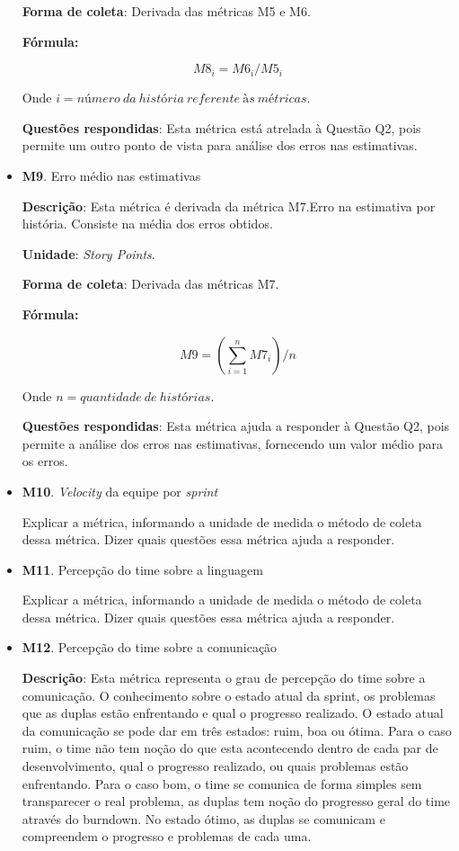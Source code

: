 \begin{itemize}
	   \subitem \textbf{Forma de coleta}: Derivada das métricas M5 e M6.
	   
	      \subsubitem \textbf{Fórmula:} 
	      
		$$ M8_i = M6_i / M5_i $$
		
	      \subsubitem Onde $i = número\ da\ história\ referente\ às\ métricas$.
	   
	   \subitem \textbf{Questões respondidas}: Esta métrica está atrelada à Questão Q2, pois permite um outro ponto de vista
		    para análise dos erros nas estimativas.
	 
	 \item \textbf{M9}. Erro médio nas estimativas
	   
	   \subitem \textbf{Descrição}: Esta métrica é derivada da métrica M7.Erro na estimativa por história.
		    Consiste na média dos erros obtidos.
	   
	   \subitem \textbf{Unidade}: \textit{Story Points}.
	   
	   \subitem \textbf{Forma de coleta}: Derivada das métricas M7.
	   
	      \subsubitem \textbf{Fórmula:} 
	      
		$$ M9 = (\sum\limits_{i=1}^{n}M7_i)/n $$
		
	      \subsubitem Onde $n = quantidade\ de\ histórias$.
	   
	   \subitem \textbf{Questões respondidas}: Esta métrica ajuda a responder à Questão Q2, pois permite a análise 
		    dos erros nas estimativas, fornecendo um valor médio para os erros.
		    
	 \item \textbf{M10}. \textit{Velocity} da equipe por \textit{sprint}
	 
	   \subitem Explicar a métrica, informando a unidade de medida o método de coleta dessa métrica. Dizer quais questões essa
		    métrica ajuda a responder.
	 
	 \item \textbf{M11}. Percepção do time sobre a linguagem
	 
	   \subitem Explicar a métrica, informando a unidade de medida o método de coleta dessa métrica. Dizer quais questões essa
		    métrica ajuda a responder.
	
	 \item \textbf{M12}. Percepção do time sobre a comunicação
	 
	    \subitem \textbf{Descrição}: Esta métrica representa o grau de percepção do time sobre a comunicação. O conhecimento sobre o estado atual da sprint, os problemas que as duplas estão enfrentando e qual o progresso realizado. O estado atual da comunicação se pode dar em três estados: ruim, boa ou ótima. Para o caso ruim, o time não tem noção do que esta acontecendo dentro de cada par de desenvolvimento, qual o progresso realizado, ou quais problemas estão enfrentando. Para o caso bom, o time se comunica de forma simples sem transparecer o real problema, as duplas tem noção do progresso geral do time através do burndown. No estado ótimo, as duplas se comunicam e compreendem o progresso e problemas de cada uma.
	   

\end{itemize}
